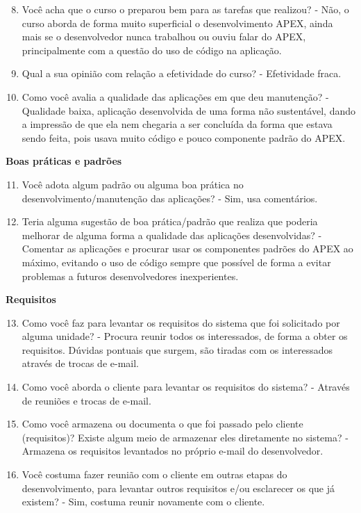 \begin{anexosenv}
\begin{enumerate}
\setcounter{enumi}{7}
\item Você acha que o curso o preparou bem para as tarefas que realizou?\newline
- Não, o curso aborda de forma muito superficial o desenvolvimento APEX, ainda mais se o desenvolvedor nunca trabalhou ou ouviu falar do APEX, principalmente com a questão do uso de código na aplicação.
\item Qual a sua opinião com relação a efetividade do curso?\newline
- Efetividade fraca.
\item Como você avalia a qualidade das aplicações em que deu manutenção?\newline
- Qualidade baixa, aplicação desenvolvida de uma forma não sustentável, dando a impressão de que ela nem chegaria a ser concluída da forma que estava sendo feita, pois usava muito código e pouco componente padrão do APEX.
\end{enumerate}

\textbf{Boas práticas e padrões}

\begin{enumerate}
\setcounter{enumi}{10}
\item Você adota algum padrão ou alguma boa prática no desenvolvimento/manutenção das
aplicações?\newline
- Sim, usa comentários.
\item Teria alguma sugestão de boa prática/padrão que realiza que poderia melhorar de
alguma forma a qualidade das aplicações desenvolvidas?\newline
- Comentar as aplicações e procurar usar os componentes padrões do APEX ao máximo, evitando o uso de código sempre que possível de forma a evitar problemas a futuros desenvolvedores inexperientes.
\end{enumerate}

\textbf{Requisitos}

\begin{enumerate}
\setcounter{enumi}{12}
\item Como você faz para levantar os requisitos do sistema que foi solicitado por alguma
unidade?\newline
- Procura reunir todos os interessados, de forma a obter os requisitos. Dúvidas pontuais que surgem, são tiradas com os interessados através de trocas de e-mail.
\item Como você aborda o cliente para levantar os requisitos do sistema?\newline
- Através de reuniões e trocas de e-mail.
\item Como você armazena ou documenta o que foi passado pelo cliente (requisitos)? Existe
algum meio de armazenar eles diretamente no sistema?\newline
- Armazena os requisitos levantados no próprio e-mail do desenvolvedor.
\item Você costuma fazer reunião com o cliente em outras etapas do desenvolvimento, para
levantar outros requisitos e/ou esclarecer os que já existem?\newline
- Sim, costuma reunir novamente com o cliente.
\end{enumerate}


\end{anexosenv}

